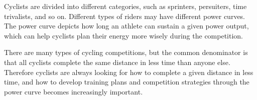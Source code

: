 \par Cyclists are divided into different categories, such as sprinters, persuiters, time trivalists, and so on. Different types of riders may have different power curves. The power curve depicts how long an athlete can sustain a given power output, which can help cyclists plan their energy more wisely during the competition.
\par There are many types of cycling competitions, but the common denominator is that all cyclists complete the same distance in less time than anyone else. Therefore cyclists are always looking for how to complete a given distance in less time, and how to develop training plans and competition strategies through the power curve becomes increasingly important.
